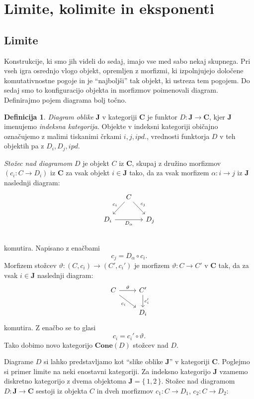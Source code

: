 \documentclass[12pt,a4paper]{book}
\theoremstyle{definition}
\newtheorem{definicija}{Definicija}[chapter]
\theoremstyle{plain}
\theoremstyle{definition}
\theoremstyle{remark}
\newcommand{\cat}[1]{\textbf{#1}}
\renewcommand{\set}[1]{\{\,#1\,\}}
\begin{document}
\section{Limite, kolimite in eksponenti}


\subsection{Limite}

Konstrukcije, ki smo jih videli do sedaj, imajo vse med sabo nekaj skupnega. Pri vseh igra osrednjo vlogo objekt, opremljen z morfizmi, ki izpolnjujejo določene komutativnostne pogoje in je "`najboljši"' tak objekt, ki ustreza tem pogojem. Do sedaj smo to konfiguracijo objekta in morfizmov poimenovali diagram. Definirajmo pojem diagrama bolj točno.

\begin{definicija}
\emph{Diagram oblike} $\cat{J}$ v kategoriji $\cat{C}$ je funktor $D : \cat{J} \to \cat{C}$, kjer $\cat{J}$ imenujemo \emph{indeksna kategorija}. Objekte v indeksni kategoriji običajno označujemo z malimi tiskanimi črkami $i,j, ipd.$, vrednosti funktorja $D$ v teh objektih pa z $D_i,D_j, ipd.$


\emph{Stožec nad diagramom} $D$ je objekt $C$ iz $\cat{C}$, skupaj z družino morfizmov $(c_i : C \to D_i)$ iz $\cat{C}$ za vsak objekt $i \in \cat{J}$ tako, da za vsak morfizem $\alpha : i \to j$ iz $\cat{J}$ naslednji diagram:
%
$$\begin{tikzcd}[column sep=small]
& C \ar[dl, "c_i"'] \ar[dr, "c_j"] & \\
D_i \ar[rr, "D_\alpha"'] & & D_j \\
\end{tikzcd}$$
%
komutira. Napisano z enačbami $$c_j = D_\alpha \circ c_i.$$
%
Morfizem stožcev $\vartheta : (C, c_i) \to (C', c_i')$ je morfizem $\vartheta : C \to C'$ v $\cat{C}$ tak, da za vsak $i \in \cat{J}$ naslednji diagram:
%
$$\begin{tikzcd}
C \ar[dr, "c_i"'] \ar[r, "\vartheta"] & C' \ar[d, "c_i'"] \\
& D_i
\end{tikzcd}$$
%
komutira. Z enačbo se to glasi
$$c_i = c_i' \circ \vartheta.$$
%
Tako dobimo novo kategorijo $\cat{Cone}(D)$ stožcev nad $D$.
\end{definicija}
%
Diagrame $D$ si lahko predstavljamo kot "`slike oblike $\cat{J}$"' v kategoriji $\cat{C}$. Poglejmo si primer limite na neki enostavni kategoriji. Za indeksno kategorijo $\cat{J}$ vzamemo diskretno kategorijo z dvema objektoma $\cat{J} = \set{1,2}$. Stožec nad diagramom $D : \cat{J} \to \cat{C}$ sestoji iz objekta $C$ in dveh morfizmov $c_1 : C \to D_1$, $c_2 : C \to D_2$:
\end{document}
